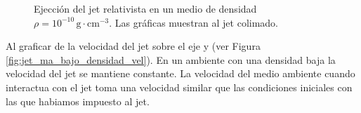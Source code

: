 \documentclass[12pt,a4paper]{book}
\begin{document}
\begin{figure}
\caption{\label{fig:jet_ma_bajo_densidad}Ejección del jet relativista en un medio de densidad $\rho = 10^{-10} \, \mathrm{g}\cdot \mathrm{cm}^{-3}$. Las gráficas muestran al jet colimado.}
\end{figure}



Al graficar de la velocidad del jet sobre el eje y (ver Figura \ref{fig:jet_ma_bajo_densidad_vel}). En un ambiente con una densidad baja la velocidad del jet se mantiene constante. La velocidad del medio ambiente cuando interactua con el jet toma una velocidad similar que las condiciones iniciales con las que habiamos impuesto al jet.
\end{document}
